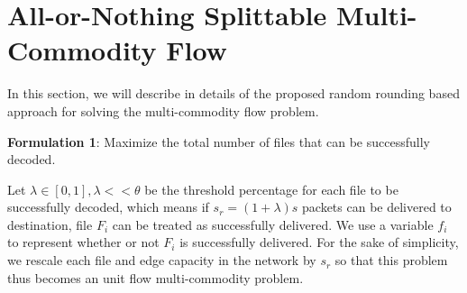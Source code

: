 \documentclass[conference]{IEEEtran}
\begin{document}
\section{All-or-Nothing Splittable Multi-Commodity Flow} \label{sec:proposed}
In this section, we will describe in details of the proposed random rounding based approach for solving the multi-commodity flow problem. 


\textbf{Formulation 1}: Maximize the total number of files that can be successfully decoded.

Let $\lambda \in [0, 1], \lambda << \theta$ be the threshold percentage for each file to be successfully decoded, which means if $s_r = (1+\lambda)s$ packets can be delivered to destination, file $F_i$ can be treated as successfully delivered. We use a variable $f_i$ to represent whether or not $F_i$ is successfully delivered. For the sake of simplicity, we rescale each file and edge capacity in the network by $s_r$ so that this problem thus becomes an unit flow multi-commodity problem.

\end{document}
